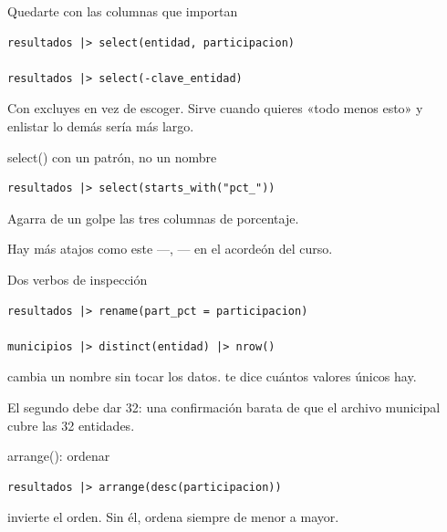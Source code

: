 \begin{frame}[fragile]{Quedarte con las columnas que importan}
\begin{lstlisting}
resultados |> select(entidad, participacion)

resultados |> select(-clave_entidad)
\end{lstlisting}

  \vspace{0.6em}
  Con \cod{-} excluyes en vez de escoger. Sirve cuando quieres «todo menos
  esto» y enlistar lo demás sería más largo.
\end{frame}

\begin{frame}[fragile]{select() con un patrón, no un nombre}
\begin{lstlisting}
resultados |> select(starts_with("pct_"))
\end{lstlisting}

  \vspace{0.6em}
  Agarra de un golpe las tres columnas de porcentaje.

  \vspace{0.4em}
  {\small\color{grisTenue}Hay más atajos como este —,
  — en el acordeón del curso.}
\end{frame}

\begin{frame}[fragile]{Dos verbos de inspección}
\begin{lstlisting}
resultados |> rename(part_pct = participacion)

municipios |> distinct(entidad) |> nrow()
\end{lstlisting}

  \vspace{0.6em}
   cambia un nombre sin tocar los datos.  te
  dice cuántos valores únicos hay.

  \vspace{0.4em}
  {\small\color{grisTenue}El segundo debe dar 32: una confirmación barata
  de que el archivo municipal cubre las 32 entidades.}
\end{frame}

\begin{frame}[fragile]{arrange(): ordenar}
\begin{lstlisting}
resultados |> arrange(desc(participacion))
\end{lstlisting}

  \vspace{0.6em}
   invierte el orden. Sin él,  ordena siempre de
  menor a mayor.
\end{frame}

